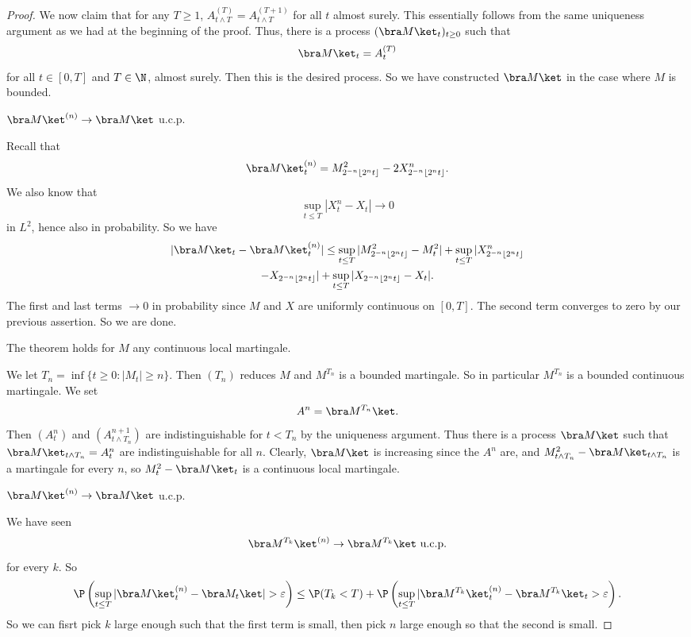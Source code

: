 \documentclass[a4paper]{article}
\begin{document}
\begin{proof}
  We now claim that for any $T \geq 1$, $A_{t \wedge T}^{(T)} = A_{t \wedge T}^{(T + 1)}$ for all $t$ almost surely. This essentially follows from the same uniqueness argument as we had at the beginning of the proof. Thus, there is a process $(\bra M\ket_t)_{t \geq 0}$ such that
  \[
    \bra M\ket_t = A_t^{(T)}
  \]
  for all $t \in [0, T]$ and $T \in \N$, almost surely. Then this is the desired process. So we have constructed $\bra M\ket$ in the case where $M$ is bounded.

  \begin{claim}
    $\bra M\ket^{(n)} \to \bra M\ket$ u.c.p.
  \end{claim}
  Recall that
  \[
    \bra M\ket_t^{(n)} = M^2_{2^{-n}\lfloor 2^n t\rfloor} - 2 X^n_{2^{-n} \lfloor 2^n t\rfloor}.
  \]
  We also know that
  \[
    \sup_{t \leq T} |X_t^n - X_t| \to 0
  \]
  in $L^2$, hence also in probability. So we have
  \begin{multline*}
    |\bra M\ket_t - \bra M\ket^{(n)}_t| \leq \sup_{t \leq T} |M^2_{2^{-n}\lfloor 2^n t\rfloor} - M_t^2| + \sup_{t \leq T} |X^n_{2^{-n}\lfloor 2^n t\rfloor} \\
    - X_{2^{-n} \lfloor 2^n t\rfloor}| + \sup_{t \leq T} |X_{2^{-n}\lfloor 2^n t\rfloor} - X_t|.
  \end{multline*}
  The first and last terms $\to 0$ in probability since $M$ and $X$ are uniformly continuous on $[0, T]$. The second term converges to zero by our previous assertion. So we are done.

  \begin{claim}
    The theorem holds for $M$ any continuous local martingale.
  \end{claim}
  We let $T_n = \inf\{t \geq 0 : |M_t| \geq n\}$. Then $(T_n)$ reduces $M$ and $M^{T_n}$ is a bounded martingale. So in particular $M^{T_n}$ is a bounded continuous martingale. We set
  \[
    A^n = \bra M^{T_n}\ket.
  \]
  Then $(A_t^n)$ and $(A_{t \wedge T_n}^{n + 1})$ are indistinguishable for $t < T_n$ by the uniqueness argument. Thus there is a process $\bra M\ket$ such that $\bra M \ket_{t \wedge T_n} = A_t^n$ are indistinguishable for all $n$. Clearly, $\bra M\ket$ is increasing since the $A^n$ are, and $M^2_{t \wedge T_n} - \bra M\ket_{t \wedge T_n}$ is a martingale for every $n$, so $M^2_t - \bra M\ket_t$ is a continuous local martingale.

  \begin{claim}
    $\bra M\ket^{(n)} \to \bra M\ket$ u.c.p.
  \end{claim}
  We have seen
  \[
    \bra M^{T_k}\ket^{(n)} \to \bra M^{T_k}\ket\text{ u.c.p.}
  \]
  for every $k$. So
  \[
    \P\left(\sup_{t \leq T} |\bra M\ket_t^{(n)} - \bra M_t\ket| > \varepsilon\right) \leq \P(T_k < T) + \P\left(\sup_{t \leq T} |\bra M^{T_k}\ket_t^{(n)} - \bra M^{T_k}\ket_t > \varepsilon\right).
  \]
  So we can fisrt pick $k$ large enough such that the first term is small, then pick $n$ large enough so that the second is small.
\end{proof}
\end{document}
